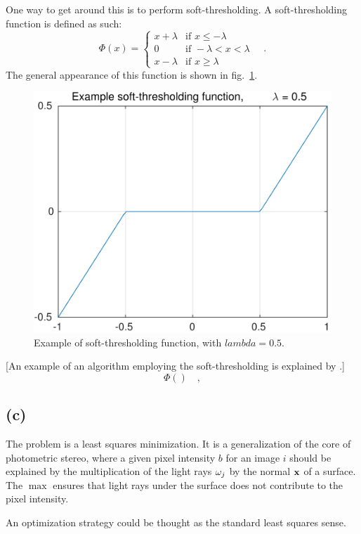 \documentclass{report}
\begin{document}
One way to get around this is to perform soft-thresholding. A soft-thresholding function is defined as such:
\begin{equation}
\Phi(x) = 
\begin{cases}
  x + \lambda & \text{if } x\leq -\lambda \\ 
  0           & \text{if } -\lambda < x < \lambda \\
  x - \lambda & \text{if } x\geq \lambda
\end{cases}
\quad.
\end{equation}
The general appearance of this function is shown in fig.~\ref{q5b:soft-thresh}.

\begin{figure}
  \centering
  \includegraphics[width=0.45\linewidth]{q5c_soft_threshold_example.pdf}
  \caption[ Example soft-thresholding function ]
   {Example of soft-thresholding function, with $lambda = 0.5$.}
  \label{q5b:soft-thresh}
\end{figure}


[An example of an algorithm employing the soft-thresholding is explained by \cite{Kowalski2015}.]
\begin{equation}
\Phi \left(  \right)
\quad,
\end{equation}



\subsection{(c)}

The problem is a least squares minimization. It is a generalization of the core of photometric stereo, where a given pixel intensity $b$ for an image $i$ should be explained by the multiplication of the light rays $\mathbf{\omega}_j$ by the normal $\mathbf{x}$ of a surface. The $\max$ ensures that light rays under the surface does not contribute to the pixel intensity.

An optimization strategy could be thought as the standard least squares sense.
\end{document}
